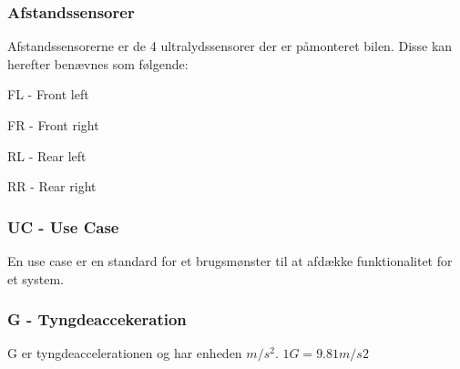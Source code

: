 \subsubsection{Afstandssensorer}
Afstandssensorerne er de 4 ultralydssensorer der er påmonteret bilen. Disse kan herefter benævnes som følgende:
\begin{packed_item}
	\item FL - Front left
	\item FR - Front right
	\item RL - Rear left
	\item RR - Rear right
\end{packed_item}

\subsubsection{UC - Use Case}
En use case er en standard for et brugsmønster til at afdække funktionalitet for et system.

\subsubsection{G - Tyngdeaccekeration}
G er tyngdeaccelerationen og har enheden $m/s^2$. $1G=9.81 m/s2$

\clearpage